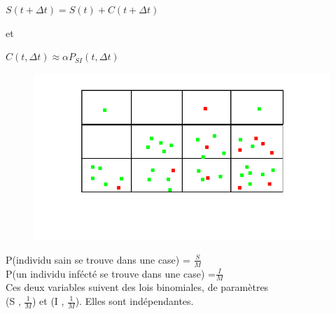 \documentclass{beamer}
\theoremstyle{plain}
\theoremstyle{definition}
\theoremstyle{remark}
\begin{document}
\begin{frame}{}

\begin{center}
$S(t+\Delta t) = S(t) + C(t + \Delta t)$
\end{center}
et 
\begin{center}
$C(t, \Delta t) \approx \alpha P_{SI}(t, \Delta t)$
\end{center}
\end{frame}
\begin{frame}

    \begin{figure}[!h]
\begin{center}
   \includegraphics[scale= 0.4]{decoupage.png}
   \end{center}
\end{figure}
P(individu sain se trouve dans une case) = $\frac{S}{M}$ \\
P(un individu infécté se trouve dans une case) =$\frac{I}{M}$\\
Ces deux variables suivent des lois binomiales, de paramètres \\ (S , $\frac{1}{M}$) et (I , $\frac{1}{M}$). Elles sont indépendantes.

\end{frame}
\end{document}
